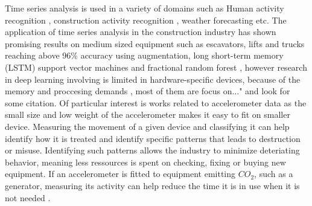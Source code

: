 Time series analysis is used in a variety of domains such as Human activity recognition \cite{HumanActivityrecognitionAccelerometer}, construction activity recognition \cite{ConstructionRecognitionFractionalRandomForest}\cite{timeseriesDataAugmentationConstruction}, weather forecasting \cite{weatherForecastTimeSeries} etc. 
The application of time series analysis in the construction industry has shown promising results on medium sized equipment such as escavators, lifts and trucks reaching above 96\% accuracy \cite{timeseriesDataAugmentationConstruction, constructionRecognitionMobileSensors,ConstructionRecognitionFractionalRandomForest} using augmentation, long short-term memory (LSTM) \cite{timeseriesDataAugmentationConstruction} support vector machines \cite{constructionRecognitionMobileSensors} and fractional random forest \cite{ConstructionRecognitionFractionalRandomForest}, however research in deep learning involving is limited in hardware-specific devices, because of the memory and proccesing demands \cite{deepLearningLowConsumptionStateOfTheArt} , most of them are focus on..." and look for some citation.
Of particular interest is works related to accelerometer data \cite{HumanActivityrecognitionAccelerometer,timeseriesDataAugmentationConstruction} as the small size and low weight of the accelerometer makes it easy to fit on smaller device. 
Measuring the movement of a given device and classifying it can help identify how it is treated and identify specific patterns that leads to destruction or misuse. 
Identifying such patterns allows the industry to minimize deteriating behavior, meaning less ressources is spent on checking, fixing or buying new equipment. 
If an accelerometer is fitted to equipment emitting $CO_2$, such as a generator, measuring its activity can help reduce the time it is in use when it is not needed .\\ 
